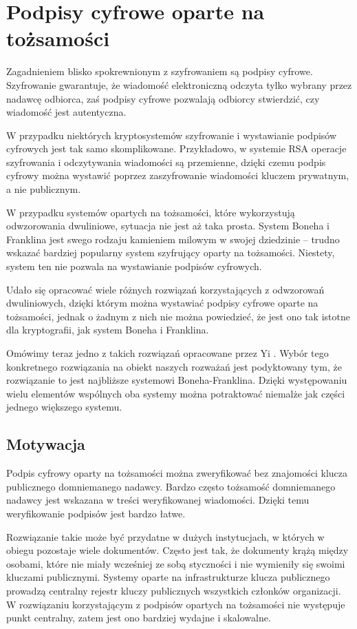 \section{Podpisy cyfrowe oparte na tożsamości}

\noindent
Zagadnieniem blisko spokrewnionym z szyfrowaniem są podpisy cyfrowe.
Szyfrowanie gwarantuje,
że wiadomość elektroniczną odczyta tylko wybrany przez nadawcę odbiorca,
zaś podpisy cyfrowe pozwalają odbiorcy stwierdzić,
czy wiadomość jest autentyczna.

\noindent
W przypadku niektórych kryptosystemów
szyfrowanie i wystawianie podpisów cyfrowych jest tak samo skomplikowane.
Przykładowo,
w systemie RSA operacje szyfrowania i odczytywania wiadomości są przemienne,
dzięki czemu podpis cyfrowy można wystawić
poprzez zaszyfrowanie wiadomości kluczem prywatnym, a nie publicznym.

\noindent
W przypadku systemów opartych na tożsamości,
które wykorzystują odwzorowania dwuliniowe,
sytuacja nie jest aż taka prosta.
System Boneha i Franklina jest swego rodzaju kamieniem milowym
w swojej dziedzinie --
trudno wskazać bardziej popularny system szyfrujący oparty na tożsamości.
Niestety, system ten nie pozwala na wystawianie podpisów cyfrowych.

\noindent
Udało się opracować wiele różnych rozwiązań
korzystających z odwzorowań dwuliniowych,
dzięki którym można wystawiać podpisy cyfrowe oparte na tożsamości,
jednak o żadnym z nich nie można powiedzieć,
że jest ono tak istotne dla kryptografii,
jak system Boneha i Franklina.

\noindent
Omówimy teraz jedno z takich rozwiązań
opracowane przez Yi \cite{yi}.
Wybór tego konkretnego rozwiązania na obiekt naszych rozważań
jest podyktowany tym,
że rozwiązanie to jest najbliższe systemowi Boneha-Franklina.
Dzięki występowaniu wielu elementów wspólnych
oba systemy można potraktować niemalże jak części jednego większego systemu.

\subsection*{Motywacja}

\noindent
Podpis cyfrowy oparty na tożsamości można zweryfikować
bez znajomości klucza publicznego domniemanego nadawcy.
Bardzo często tożsamość domniemanego nadawcy
jest wskazana w treści weryfikowanej wiadomości.
Dzięki temu weryfikowanie podpisów jest bardzo łatwe.

\noindent
Rozwiązanie takie może być przydatne w dużych instytucjach,
w których w obiegu pozostaje wiele dokumentów.
Często jest tak, że dokumenty krążą między osobami,
które nie miały wcześniej ze sobą styczności
i nie wymieniły się swoimi kluczami publicznymi.
Systemy oparte na infrastrukturze klucza publicznego
prowadzą centralny rejestr kluczy publicznych
wszystkich członków organizacji.
W rozwiązaniu korzystającym z podpisów opartych na tożsamości
nie występuje punkt centralny,
zatem jest ono bardziej wydajne i skalowalne.

